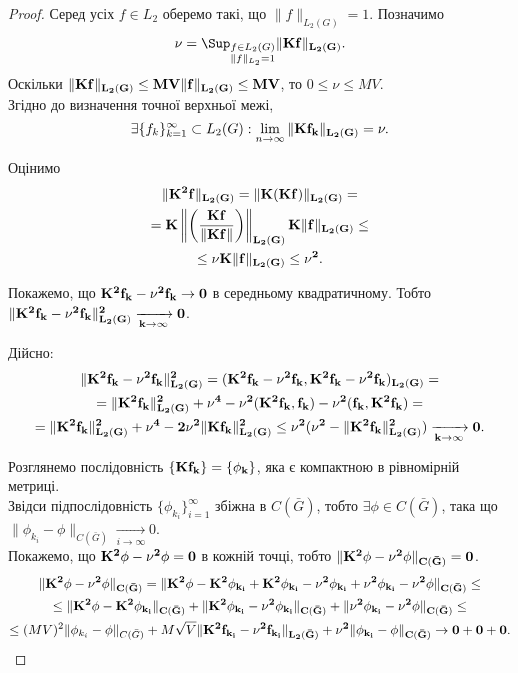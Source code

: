 \begin{proof}
	Серед усіх $f \in L_2$ оберемо такі, що $\|f\|_{L_2(G)} = 1$. Позначимо \[\nu = \Sup_{\substack{f \in L_2(G) \\ \|f\|_{L_2} = 1}} \|\bf{K} f\|_{L_2(G)}.\] Оскільки $\|\bf{K} f\|_{L_2(G)} \le MV \|f\|_{L_2(G)} \le MV$, то $0 \le \nu \le MV$. \\

	Згідно до визначення точної верхньої межі, \[\exists \{ f_k \}_{k = 1}^\infty \subset L_2(G):\lim_{n \to \infty} \|\bf{K} f_k\|_{L_2(G)} = \nu. \]

	Оцінимо 
	\begin{multline*} 
	\| \bf{K}^2 f\|_{L_2(G)} = \| \bf{K} (\bf{K} f)\|_{L_2(G)} = \\
	= \bf{K} \left\| \left( \dfrac{\bf{K}f}{\|\bf{K}f\|}\right) \right\|_{L_2(G)} \bf{K} \|f\|_{L_2(G)} \le \\
	\le  \nu \bf{K} \|f\|_{L_2(G)} \le \nu^2.
	\end{multline*}
	
	Покажемо, що $\bf{K}^2 f_k - \nu^2 f_k \to 0$ в середньому квадратичному. Тобто $\| \bf{K}^2 f_k - \nu^2 f_k \|_{L_2(G)}^2 \xrightarrow[k \to \infty]{} 0$.

	Дійсно:
	\begin{multline*}
		\| \bf{K}^2 f_k - \nu^2 f_k \|_{L_2(G)}^2 = (\bf{K}^2 f_k - \nu^2 f_k, \bf{K}^2 f_k - \nu^2 f_k)_{L_2(G)} = \\
		= \|\bf{K}^2 f_k\|_{L_2(G)}^2 + \nu^4 - \nu^2 (\bf{K}^2 f_k, f_k) - \nu^2 (f_k, \bf{K}^2 f_k) = \\
		= \|\bf{K}^2 f_k\|_{L_2(G)}^2 + \nu^4 - 2 \nu^2 \|\bf{K} f_k\|_{L_2(G)}^2 \le \nu^2 (\nu^2 - \|\bf{K}^2 f_k\|_{L_2(G)}^2) \xrightarrow[k\to\infty]{} 0.
	\end{multline*}

	Розглянемо послідовність $\{ \bf{K}f_k \} = \{ \phi_k\}$, яка є компактною в рівномірній метриці. \\

	Звідси підпослідовність $\{\phi_{k_i}\}_{i = 1}^\infty$ збіжна в $C(\bar G)$, тобто $\exists \phi \in C(\bar G)$, така що $\| \phi_{k_i} - \phi\|_{C(\bar G)} \xrightarrow[i \to \infty]{} 0$. \\

	Покажемо, що $\bf{K}^2 \phi - \nu^2 \phi = 0$ в кожній точці, тобто $\| \bf{K}^2\phi - \nu^2 \phi\|_{C(\bar G)} = 0$. 
	\begin{multline*}
		\|\bf{K}^2\phi-\nu^2\phi\|_{C(\bar G)} = \|\bf{K}^2\phi-\bf{K}^2\phi_{k_i}+\bf{K}^2\phi_{k_i}-\nu^2\phi_{k_i}+\nu^2\phi_{k_i}-\nu^2\phi\|_{C(\bar G)} \le \\
		\le \|\bf{K}^2\phi-\bf{K}^2\phi_{k_i}\|_{C(\bar G)} + \|\bf{K}^2\phi_{k_i}-\nu^2\phi_{k_i}\|_{C(\bar G)}+\|\nu^2\phi_{k_i}-\nu^2\phi\|_{C(\bar G)} \le \\
		\le (MV)^2 \|\phi_{k_i} - \phi\|_{C(\bar G)} + M\sqrt{V} \|\bf{K}^2f_{k_i}-\nu^2f_{k_i}\|_{L_2(\bar G)} + \nu^2 \|\phi_{k_i} - \phi\|_{C(\bar G)} \to 0 + 0 + 0.
	\end{multline*}
	

\end{proof}
